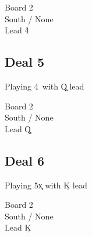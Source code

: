 \documentclass[a4paper]{article}
\begin{document}
\dealdiagram
{\vhand{\void}{\void}{\void}{\void}}
{}
{\vhand{\void}{\void}{\void}{\void}}
{}
{Board 2\\South / None\\Lead \h 4}

\subsection{Deal 5}

Playing 4\s\ with \c Q lead

\dealdiagram
{\vhand{\void}{\void}{\void}{\void}}
{}
{\vhand{\void}{\void}{\void}{\void}}
{}
{Board 2\\South / None\\Lead \c Q}

\subsection{Deal 6}

Playing 5\c x with \d K lead

\dealdiagram
{\vhand{\void}{\void}{\void}{\void}}
{}
{\vhand{\void}{\void}{\void}{\void}}
{}
{Board 2\\South / None\\Lead \d K}
\end{document}
